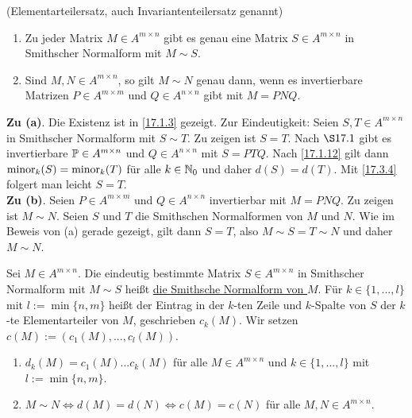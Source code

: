 \documentclass[../../main.tex]{subfiles}
\begin{document}
\begin{sat}\label{17.3.5}
(Elementarteilersatz, auch Invariantenteilersatz genannt)
\begin{enumerate}[\normalfont(a)]
\item Zu jeder Matrix $M\in A^{m\times n}$ gibt es genau eine Matrix $S\in A^{m\times n}$ in Smithscher Normalform mit $M\sim S$.
\item Sind $M,N\in A^{m\times n}$, so gilt $M\sim N$ genau dann, wenn es invertierbare Matrizen $P\in A^{m\times m}$ und $Q\in A^{n\times n}$ gibt mit $M=PNQ$.
\end{enumerate}
\end{sat}
\begin{cproof}
\textbf{Zu (a)}. Die Existenz ist in \ref{17.1.3} gezeigt. Zur Eindeutigkeit: Seien $S,T\in A^{m\times n}$ in Smithscher Normalform mit $S\sim T$. Zu zeigen ist $S=T$. Nach $\S 17.1$ gibt es invertierbare $\P\in A^{m\times n}$ und $Q\in A^{n\times n}$ mit $S=PTQ$. Nach \ref{17.1.12} gilt dann $\minor_k(S)=\minor_k(T)$ für alle $k\in\N_0$ und daher $d(S)=d(T)$. Mit \ref{17.3.4} folgert man leicht $S=T$.\\

\noindent\textbf{Zu (b)}. Seien $P\in A^{m\times m}$ und $Q\in A^{n\times n}$ invertierbar mit $M=PNQ$. Zu zeigen ist $M\sim N$. Seien $S$ und $T$ die Smithschen Normalformen von $M$ und $N$. Wie im Beweis von (a) gerade gezeigt, gilt dann $S=T$, also $M\sim S=T\sim N$ und daher $M\sim N$.
\end{cproof}

\begin{df}\label{17.3.6}
Sei $M\in A^{m\times n}$. Die eindeutig bestimmte Matrix $S\in A^{m\times n}$ in Smithscher Normalform mit $M\sim S$ heißt \underline{die Smithsche Normalform von $M$}. Für $k\in \{1,...,l\}$ mit $l:=\min\{n,m\}$ heißt der Eintrag in der $k$-ten Zeile und $k$-Spalte von $S$ der $k$-te Elementarteiler von $M$, geschrieben $c_k(M)$. Wir setzen $c(M):=(c_1(M),...,c_l(M))$.
\end{df}

\begin{kor}\label{17.3.7}
\begin{enumerate}[\normalfont(a)]
\item $d_k(M)=c_1(M)...c_k(M)$ für alle $M\in A^{m\times n}$ und $k\in\{1,...,l\}$ mit $l:=\min\{n,m\}$.
\item $M\sim N\Longleftrightarrow d(M)=d(N)\Longleftrightarrow c(M)=c(N)$ für alle $M,N\in A^{m\times n}$.
\end{enumerate}
\end{kor}
\end{document}
